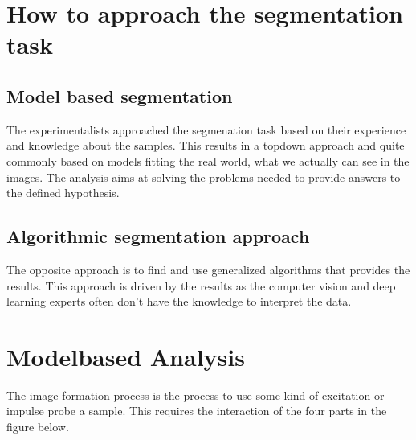 \documentclass[letterpaper,10pt,english]{sphinxmanual}
\begin{document}
\section{How to approach the segmentation task}
\label{\detokenize{04-BasicSegmentation:how-to-approach-the-segmentation-task}}

\subsection{Model based segmentation}
\label{\detokenize{04-BasicSegmentation:model-based-segmentation}}
\sphinxAtStartPar
The experimentalists approached the segmenation task based on their experience and knowledge about the samples. This results in a top\sphinxhyphen{}down approach and quite commonly based on models fitting the real world, what we actually can see in the images. The analysis aims at solving the problems needed to provide answers to the defined hypothesis.


\subsection{Algorithmic segmentation approach}
\label{\detokenize{04-BasicSegmentation:algorithmic-segmentation-approach}}
\sphinxAtStartPar
The opposite approach is to find and use generalized algorithms that provides the results. This approach is driven by the results as the computer vision and deep learning experts often don’t have the knowledge to interpret the data.




\section{Model\sphinxhyphen{}based Analysis}
\label{\detokenize{04-BasicSegmentation:model-based-analysis}}
\sphinxAtStartPar
The image formation process is the process to use some kind of excitation or impulse probe a sample. This requires the interaction of the four parts in the figure below.
\end{document}
